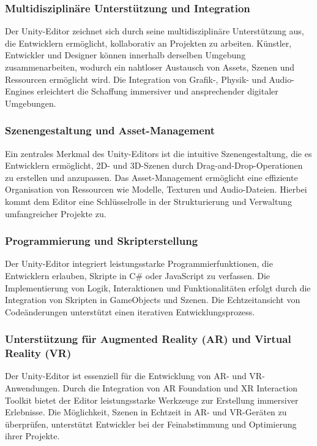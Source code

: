 \subsubsection{Multidisziplinäre Unterstützung und Integration}
Der Unity-Editor zeichnet sich durch seine multidisziplinäre Unterstützung aus, die Entwicklern ermöglicht, kollaborativ
an Projekten zu arbeiten. Künstler, Entwickler und Designer können innerhalb derselben Umgebung zusammenarbeiten,
wodurch ein nahtloser Austausch von Assets, Szenen und Ressourcen ermöglicht wird. Die Integration von Grafik-,
Physik- und Audio-Engines erleichtert die Schaffung immersiver und ansprechender digitaler Umgebungen.

\subsubsection{Szenengestaltung und Asset-Management}
Ein zentrales Merkmal des Unity-Editors ist die intuitive Szenengestaltung, die es Entwicklern ermöglicht,
2D- und 3D-Szenen durch Drag-and-Drop-Operationen zu erstellen und anzupassen. Das Asset-Management ermöglicht eine
effiziente Organisation von Ressourcen wie Modelle, Texturen und Audio-Dateien. Hierbei kommt dem Editor eine
Schlüsselrolle in der Strukturierung und Verwaltung umfangreicher Projekte zu.

\subsubsection{Programmierung und Skripterstellung}
Der Unity-Editor integriert leistungsstarke Programmierfunktionen, die Entwicklern erlauben, Skripte in C# oder
JavaScript zu verfassen. Die Implementierung von Logik, Interaktionen und Funktionalitäten erfolgt durch die
Integration von Skripten in GameObjects und Szenen. Die Echtzeitansicht von Codeänderungen unterstützt einen
iterativen Entwicklungsprozess.

\subsubsection{Unterstützung für Augmented Reality (AR) und Virtual Reality (VR)}
Der Unity-Editor ist essenziell für die Entwicklung von AR- und VR-Anwendungen. Durch die Integration von AR Foundation
und XR Interaction Toolkit bietet der Editor leistungsstarke Werkzeuge zur Erstellung immersiver Erlebnisse. Die
Möglichkeit, Szenen in Echtzeit in AR- und VR-Geräten zu überprüfen, unterstützt Entwickler bei der Feinabstimmung
und Optimierung ihrer Projekte.

